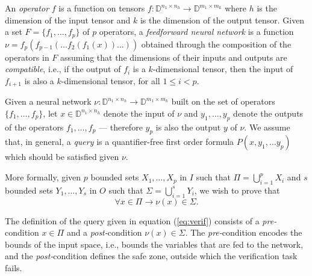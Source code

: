 An \emph{operator} $f$ is a function on tensors 
$f: \mathbb{D}^{n_{1} \times n_h} \to \mathbb{D}^{m_{1} \times m_k}$
where $h$ is the dimension of the input tensor and $k$ is the 
dimension of the output tensor. Given a set $F = \{f_1, \ldots, 
	f_p\}$ of $p$ operators, a \emph{feedforward neural network}
is a function $\nu = f_p(f_{p-1}(\ldots f_2(f_1(x))\ldots))$ obtained
through the composition of the operators in $F$ assuming that the 
dimensions of their inputs and outputs are \emph{compatible}, i.e.,
if the  output of $f_i$ is a $k$-dimensional tensor, then the input
of $f_{i+1}$ is also a $k$-dimensional tensor, for all $1 \leq i < p$.

Given a neural network $\nu : \mathbb{D}^{n_{1} \times n_h} \to
\mathbb{D}^{m_{1} \times m_k}$ built on the set of operators $\{f_1,
\ldots, f_p\}$, let $x \in \mathbb{D}^{n_{1} \times n_h}$ denote
the input of $\nu$ and $y_1, \ldots, y_p$ denote the outputs of the
operators $f_1, \ldots, f_p$ --- therefore $y_p$ is also the output
$y$ of $\nu$. We assume that, in general, a \emph{query} is a quantifier-free
first order formula $P(x, y_1, \ldots y_p)$ which should be satisfied given 
$\nu$.

More formally, given $p$ bounded sets $X_1, \ldots, X_p$ in $I$ 
such that $\Pi = \bigcup_{i=1}^p X_i$ and $s$ bounded sets $Y_1, 
\ldots, Y_s$ in $O$ such that $\Sigma = \bigcup_{i=1}^s Y_i$, we wish
to prove that  
\begin{equation}
	\label{eq:verif}
	\forall x \in \Pi \rightarrow \nu(x) \in \Sigma.
\end{equation}

The definition of the query given in equation (\ref{eq:verif})
consists of a \textit{pre-}condition $x \in \Pi$ and a 
\textit{post-}condition $\nu(x) \in \Sigma$. The 
\textit{pre-}condition encodes the bounds of the input space, i.e.,
bounds the variables that are fed to the network, and the 
\textit{post-}condition defines the safe zone, outside which the 
verification task fails.

\usetikzlibrary{
    arrows.meta,    %
    positioning,    %
    shapes.geometric, %
    trees           %
}


